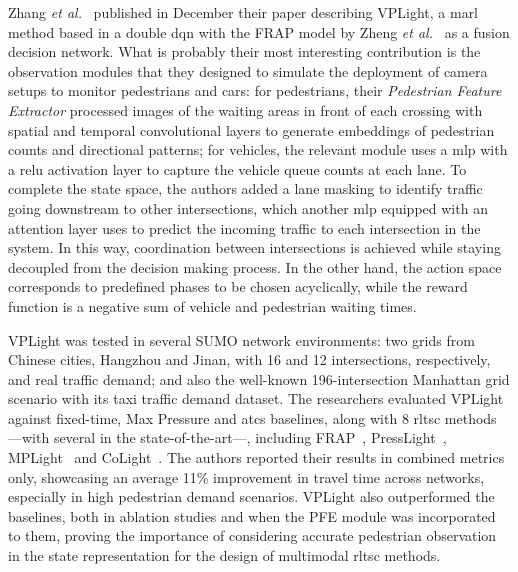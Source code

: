 Zhang \textit{et al.}~\cite{Zhang2025c} published in December their paper describing VPLight, a \gls{marl} method based in a double \gls{dqn} with the FRAP model by Zheng \textit{et al.}~\cite{Zheng2019} as a fusion decision network. What is probably their most interesting contribution is the observation modules that they designed to simulate the deployment of camera setups to monitor pedestrians and cars: for pedestrians, their \textit{Pedestrian Feature Extractor} processed images of the waiting areas in front of each crossing with spatial and temporal convolutional layers to generate embeddings of pedestrian counts and directional patterns; for vehicles, the relevant module uses a \gls{mlp} with a \acrfull{relu} activation layer to capture the vehicle queue counts at each lane. To complete the state space, the authors added a lane masking to identify traffic going downstream to other intersections, which another \gls{mlp} equipped with an attention layer uses to predict the incoming traffic to each intersection in the system. In this way, coordination between intersections is achieved while staying decoupled from the decision making process. In the other hand, the action space corresponds to predefined phases to be chosen acyclically, while the reward function is a negative sum of vehicle and pedestrian waiting times.

VPLight was tested in several SUMO network environments: two grids from Chinese cities, Hangzhou and Jinan, with 16 and 12 intersections, respectively, and real traffic demand; and also the well-known 196-intersection Manhattan grid scenario with its taxi traffic demand dataset. The researchers evaluated VPLight against fixed-time, Max Pressure and \gls{atcs} baselines, along with 8 \gls{rltsc} methods —with several in the state-of-the-art—, including FRAP~\cite{Zheng2019}, PressLight~\cite{Wei2019b}, MPLight~\cite{Chen2020} and CoLight~\cite{Zhang2021b}. The authors reported their results in combined metrics only, showcasing an average 11\% improvement in travel time across networks, especially in high pedestrian demand scenarios. VPLight also outperformed the baselines, both in ablation studies and when the PFE module was incorporated to them, proving the importance of considering accurate pedestrian observation in the state representation for the design of multimodal \gls{rltsc} methods.

